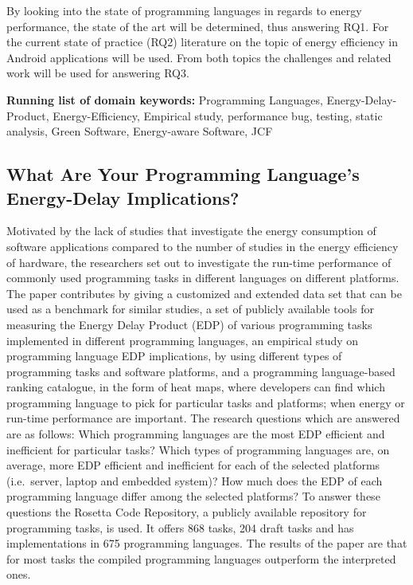 \documentclass[]{book}
\begin{document}
By looking into the state of programming languages in regards to energy
performance, the state of the art will be determined, thus answering
RQ1. For the current state of practice (RQ2) literature on the topic of
energy efficiency in Android applications will be used. From both topics
the challenges and related work will be used for answering RQ3.

\textbf{Running list of domain keywords:} Programming Languages,
Energy-Delay-Product, Energy-Efficiency, Empirical study, performance
bug, testing, static analysis, Green Software, Energy-aware Software,
JCF

\subsection{What Are Your Programming Language's Energy-Delay
Implications?}\label{what-are-your-programming-languages-energy-delay-implications}

Motivated by the lack of studies that investigate the energy consumption
of software applications compared to the number of studies in the energy
efficiency of hardware, the researchers set out to investigate the
run-time performance of commonly used programming tasks in different
languages on different platforms. The paper contributes by giving a
customized and extended data set that can be used as a benchmark for
similar studies, a set of publicly available tools for measuring the
Energy Delay Product (EDP) of various programming tasks implemented in
different programming languages, an empirical study on programming
language EDP implications, by using different types of programming tasks
and software platforms, and a programming language-based ranking
catalogue, in the form of heat maps, where developers can find which
programming language to pick for particular tasks and platforms; when
energy or run-time performance are important. The research questions
which are answered are as follows: Which programming languages are the
most EDP efficient and inefficient for particular tasks? Which types of
programming languages are, on average, more EDP efficient and
inefficient for each of the selected platforms (i.e.~server, laptop and
embedded system)? How much does the EDP of each programming language
differ among the selected platforms? To answer these questions the
Rosetta Code Repository, a publicly available repository for programming
tasks, is used. It offers 868 tasks, 204 draft tasks and has
implementations in 675 programming languages. The results of the paper
are that for most tasks the compiled programming languages outperform
the interpreted ones.
\end{document}
